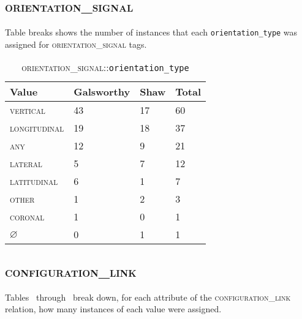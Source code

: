 \documentclass[11pt]{article}
\newcommand{\crefrangeconjunction}{~through~}
\begin{document}
\begin{appendix}
    \subsection{\textsc{orientation\_signal}} %
    \label{sub:orientation_signal-counts}
    
    Table  breaks shows the number of instances that each \texttt{orientation\_type} was assigned for \textsc{orientation\_signal} tags.
    
    \begin{table}[here]
    \begin{center}
    \begin{tabular}
        {|l|l|l|l|}
        \hline  \textbf{Value} & \textbf{Galsworthy} & \textbf{Shaw} & \textbf{Total} \\
        \hline  \textsc{vertical} & 43 & 17 & 60     \\
        \hline  \textsc{longitudinal} & 19 & 18 & 37 \\
        \hline  \textsc{any} & 12 & 9 & 21           \\
        \hline  \textsc{lateral} & 5 & 7 & 12        \\
        \hline  \textsc{latitudinal} & 6 & 1 & 7     \\
        \hline  \textsc{other} & 1 & 2 & 3           \\
        \hline  \textsc{coronal} & 1 & 0 & 1         \\
        \hline  $\varnothing$ & 0 & 1 & 1            \\
        \hline
    \end{tabular}
    \caption{\textsc{orientation\_signal}::\texttt{orientation\_type}}
    \label{tab:orientation_type-counts}
    \end{center}
    \end{table}
    
    \subsection{\textsc{configuration\_link}} %
    \label{sub:configuration_link-counts}
    
    Tables \crefrangeconjunction{} break down, for each attribute of the \textsc{configuration\_link} relation, how many instances of each value were assigned.
    

\end{appendix}
\end{document}
